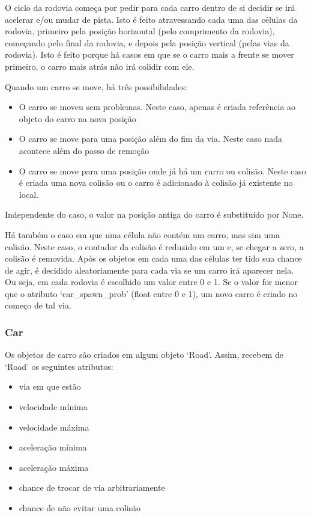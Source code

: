 \documentclass{article}
\begin{document}
    O ciclo da rodovia começa por pedir para cada carro dentro de si decidir se irá acelerar e/ou mudar de pista.
    Isto é feito atravessando cada uma das células da rodovia, primeiro pela posição horizontal (pelo comprimento
    da rodovia), começando pelo final da rodovia, e depois pela posição vertical (pelas vias da rodovia). Isto é
    feito porque há casos em que se o carro mais a frente se mover primeiro, o carro mais atrás não irá colidir com
    ele.

    Quando um carro se move, há três possibilidades:
    \begin{itemize}
    \item O carro se moveu sem problemas. Neste caso, apenas é criada referência ao objeto do carro na nova posição
    \item O carro se move para uma posição além do fim da via. Neste caso nada acontece além do passo de remoção
    \item O carro se move para uma posição onde já há um carro ou colisão. Neste caso é  criada uma nova colisão ou o
    carro é adicionado à colisão já existente no local.
    \end{itemize}
    
    Independente do caso, o valor na posição antiga do carro é substituído por None.
    
    Há também o caso em que uma célula não contém um carro, mas sim uma colisão. Neste caso, o contador da colisão
    é reduzido em um e, se chegar a zero, a colisão é removida.
    Após os objetos em cada uma das células ter tido sua chance de agir, é decidido aleatoriamente para cada via se
    um carro irá aparecer nela. Ou seja, em cada rodovia é escolhido um valor entre 0 e 1. Se o valor for menor
    que o atributo `car\_spawn\_prob' (float entre 0 e 1), um novo carro é criado no começo de tal via.
    

    \subsubsection*{Car}
    Os objetos de carro são criados em algum objeto `Road'. Assim, recebem de `Road' os seguintes atributos:

    \begin{itemize}
    \item via em que estão
    \item velocidade mínima
    \item velocidade máxima
    \item aceleração mínima
    \item aceleração máxima
    \item chance de trocar de via arbitrariamente
    \item chance de não evitar uma colisão
    \end{itemize}
\end{document}
